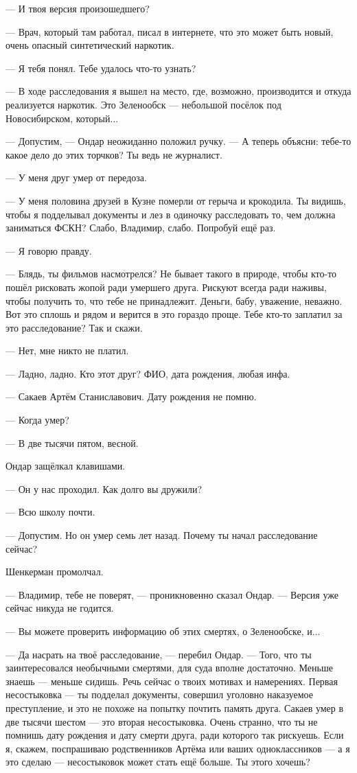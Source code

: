 \documentclass[a4paper,10pt,fleqn]{book}\usepackage{polyglossia}\setdefaultlanguage{english}\setotherlanguage{russian}\defaultfontfeatures{Ligatures=TeX,Mapping=tex-text} \usepackage{xcolor}\definecolor{lightgray}{HTML}{bbbbbb}\color{lightgray}\newcommand{\ml}[3]{\textcolor{black}{#3}}
\begin{document}
--- И твоя версия произошедшего?

--- Врач, который там работал, писал в интернете, что это может быть новый, очень опасный синтетический наркотик.

--- Я тебя понял.
Тебе удалось что-то узнать?

--- В ходе расследования я вышел на место, где, возможно, производится и откуда реализуется наркотик.
Это Зеленообск --- небольшой посёлок под Новосибирском, который...

--- Допустим, --- Ондар неожиданно положил ручку.
--- А теперь объясни: тебе-то какое дело до этих торчков?
Ты ведь не журналист.

--- У меня друг умер от передоза.

--- У меня половина друзей в Кузне померли от герыча и крокодила.
Ты видишь, чтобы я подделывал документы и лез в одиночку расследовать то, чем должна заниматься ФСКН?
Слабо, Владимир, слабо.
Попробуй ещё раз.

--- Я говорю правду.

--- Блядь, ты фильмов насмотрелся?
Не бывает такого в природе, чтобы кто-то пошёл рисковать жопой ради умершего друга.
Рискуют всегда ради наживы, чтобы получить то, что тебе не принадлежит.
Деньги, бабу, уважение, неважно.
Вот это сплошь и рядом и верится в это гораздо проще.
Тебе кто-то заплатил за это расследование?
Так и скажи.

--- Нет, мне никто не платил.

--- Ладно, ладно.
Кто этот друг?
ФИО, дата рождения, любая инфа.

--- Сакаев Артём Станиславович.
Дату рождения не помню.

--- Когда умер?

--- В две тысячи пятом, весной.

Ондар защёлкал клавишами.

--- Он у нас проходил.
Как долго вы дружили?

--- Всю школу почти.

--- Допустим.
Но он умер семь лет назад.
Почему ты начал расследование сейчас?

Шенкерман промолчал.

--- Владимир, тебе не поверят, --- проникновенно сказал Ондар.
--- Версия уже сейчас никуда не годится.

--- Вы можете проверить информацию об этих смертях, о Зеленообске, и...

--- Да насрать на твоё расследование, --- перебил Ондар.
--- Того, что ты заинтересовался необычными смертями, для суда вполне достаточно.
Меньше знаешь --- меньше сидишь.
Речь сейчас о твоих мотивах и намерениях.
Первая несостыковка --- ты подделал документы, совершил уголовно наказуемое преступление, и это не похоже на попытку почтить память друга.
Сакаев умер в две тысячи шестом --- это вторая несостыковка.
Очень странно, что ты не помнишь дату рождения и дату смерти друга, ради которого так рискуешь.
Если я, скажем, поспрашиваю родственников Артёма или ваших одноклассников --- а я это сделаю --- несостыковок может стать ещё больше.
Ты этого хочешь?
\end{document}
